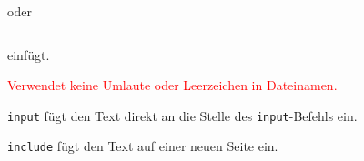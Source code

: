 \bigskip
oder

\bigskip
\begin{verbatim}\end{verbatim}
einfügt.

\bigskip
\noindent\textcolor{red}{Verwendet keine Umlaute oder Leerzeichen in Dateinamen.}

\noindent\texttt{input} fügt den Text direkt an die Stelle des \texttt{input}-Befehls ein.

\noindent\texttt{include} fügt den Text auf einer neuen Seite ein. 

